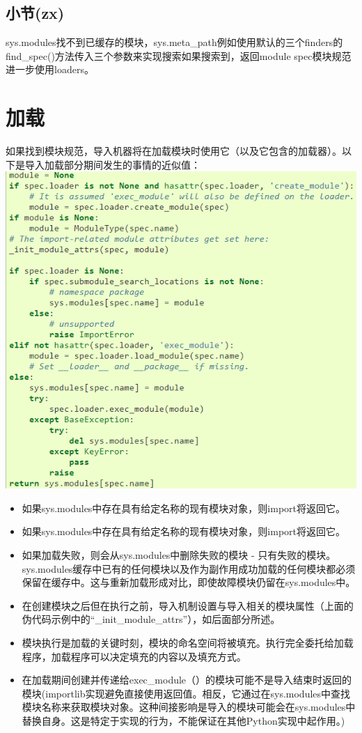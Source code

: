 \documentclass[10pt,UTF8]{ctexart}
\begin{document}
\subsection{小节(zx)}
sys.modules找不到已缓存的模块，sys.meta_path例如使用默认的三个finders的find_spec()方法传入三个参数来实现搜索如果搜索到，返回module spec模块规范进一步使用loaders。
\section{加载}
如果找到模块规范，导入机器将在加载模块时使用它（以及它包含的加载器）。以下是导入加载部分期间发生的事情的近似值：\\
\includegraphics[scale=0.5]{import.png} \\
\begin{itemize}
\item 如果sys.modules中存在具有给定名称的现有模块对象，则import将返回它。
\item 如果sys.modules中存在具有给定名称的现有模块对象，则import将返回它。
\item 如果加载失败，则会从sys.modules中删除失败的模块 - 只有失败的模块。 sys.modules缓存中已有的任何模块以及作为副作用成功加载的任何模块都必须保留在缓存中。这与重新加载形成对比，即使故障模块仍留在sys.modules中。
\item 在创建模块之后但在执行之前，导入机制设置与导入相关的模块属性（上面的伪代码示例中的“_init_module_attrs”），如后面部分所述。
\item 模块执行是加载的关键时刻，模块的命名空间将被填充。执行完全委托给加载程序，加载程序可以决定填充的内容以及填充方式。
\item 在加载期间创建并传递给exec_module（）的模块可能不是导入结束时返回的模块(importlib实现避免直接使用返回值。相反，它通过在sys.modules中查找模块名称来获取模块对象。这种间接影响是导入的模块可能会在sys.modules中替换自身。这是特定于实现的行为，不能保证在其他Python实现中起作用。)
\end{itemize}
\end{document}
